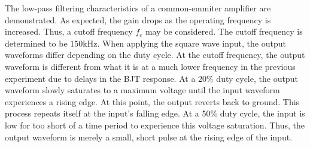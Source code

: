 The low-pass filtering characteristics of a common-emmiter amplifier are demonstrated. As expected, the gain drops as the operating frequency is increased. Thus, a cutoff frequency $f_c$ may be considered. The cutoff frequency is determined to be $150$\si{\kilo\hertz}. When applying the square wave input, the output waveforms differ depending on the duty cycle. At the cutoff frequency, the output waveform is different from what it is at a much lower frequency in the previous experiment due to delays in the BJT response. At a 20\% duty cycle, the output waveform slowly saturates to a maximum voltage until the input waveform experiences a rising edge. At this point, the output reverts back to ground. This process repeats itself at the input's falling edge. At a 50\% duty cycle, the input is low for too short of a time period to experience this voltage saturation. Thus, the output waveform is merely a small, short pulse at the rising edge of the input.
